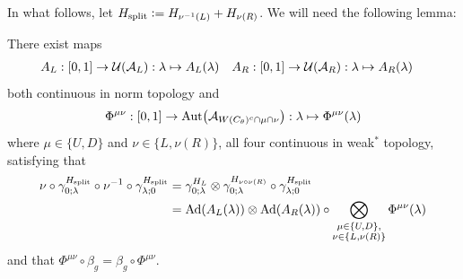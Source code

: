 \documentclass[12pt,a4paper,twoside]{article}
\numberwithin{equation}{section}
\begin{document}
In what follows, let $H_{\text{split}}\vcentcolon= H_{\nu^{-1}(L)}+H_{\nu(R)}$. We will need the following lemma:
\begin{lemma}\label{lem:SplittedAutomorphismAfterTranslatedIsVertical}
	There exist maps
	\begin{align}
		A_L&:[0,1]\rightarrow \mathcal U(\mathcal A_L):\lambda\mapsto A_{L}(\lambda)&A_R&:[0,1]\rightarrow \mathcal U(\mathcal A_R):\lambda\mapsto A_{R}(\lambda)
	\end{align}
	both continuous in norm topology and
	\begin{align}
		\Phi^{\mu\nu}:[0,1]\rightarrow\Aut{\AA_{W(C_\theta)^c\cap\mu\cap\nu}}:\lambda\mapsto \Phi^{\mu\nu}(\lambda)
	\end{align}
	where $\mu\in\{U,D\}$ and $\nu\in\{L,\nu(R)\}$, all four continuous in weak$^*$ topology, satisfying that
	\begin{align}
		\nu\circ\gamma^{H_{\text{split}}}_{0;\lambda}\circ\nu^{-1}\circ\gamma^{H_{\text{split}}}_{\lambda;0}&=\gamma^{H_L}_{0;\lambda}\otimes\gamma^{H_{\nu\circ\nu(R)}}_{0;\lambda}\circ\gamma^{H_{\text{split}}}_{\lambda;0}\\
		\label{eq:TranslatingSplittedTimeEvolutionAppendix}
		&=\Ad{A_L(\lambda)}\otimes\Ad{A_R(\lambda)}\circ\bigotimes_{\substack{\mu\in\{U,D\},\\\nu\in\{L,\nu(R)\}}}\Phi^{\mu\nu}(\lambda)
	\end{align}
	and that $\Phi^{\mu\nu}\circ\beta_g=\beta_g\circ\Phi^{\mu\nu}$.
\end{lemma}
\end{document}
